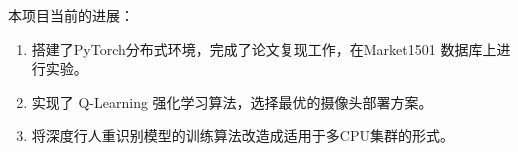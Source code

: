 本项目当前的进展：

\begin{enumerate}
\item 搭建了PyTorch分布式环境，完成了论文复现工作，在Market1501\cite{zheng2015scalable}
数据库上进行实验。
\item 实现了 Q-Learning 强化学习算法，选择最优的摄像头部署方案。
\item 将深度行人重识别模型的训练算法改造成适用于多CPU集群的形式。
\end{enumerate}

























